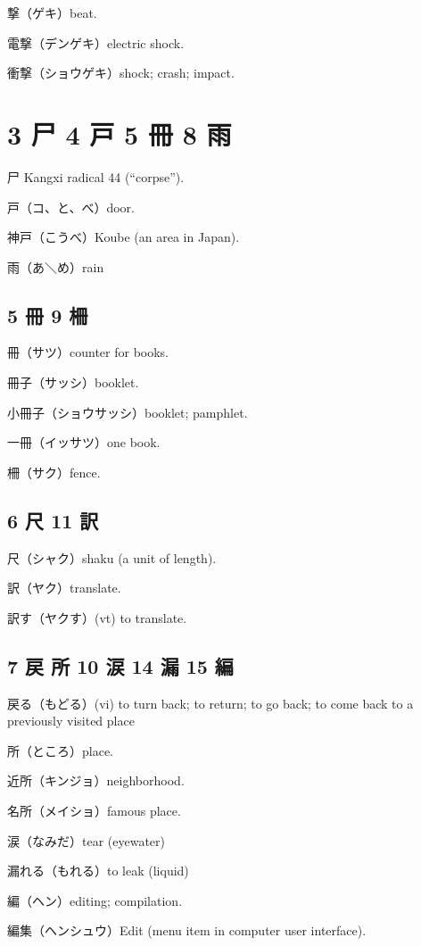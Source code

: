 撃（ゲキ）beat.

電撃（デンゲキ）electric shock.

衝撃（ショウゲキ）shock; crash; impact.

\section{3 尸 4 戸 5 冊 8 雨}

尸 Kangxi radical 44 (``corpse'').

戸（コ、と、べ）door.

神戸（こうべ）Koube (an area in Japan).

雨（あ＼め）rain

\subsection{5 冊 9 柵}

冊（サツ）counter for books.

冊子（サッシ）booklet.

小冊子（ショウサッシ）booklet; pamphlet.

一冊（イッサツ）one book.

柵（サク）fence.

\subsection{6 尺 11 訳}

尺（シャク）shaku (a unit of length).

訳（ヤク）translate.

訳す（ヤクす）(vt) to translate.

\subsection{7 戻 所 10 涙 14 漏 15 編}

戻る（もどる）(vi) to turn back; to return; to go back;
to come back to a previously visited place

所（ところ）place.

近所（キンジョ）neighborhood.

名所（メイショ）famous place.

涙（なみだ）tear (eyewater)

漏れる（もれる）to leak (liquid)

編（ヘン）editing; compilation.

編集（ヘンシュウ）Edit (menu item in computer user interface).

